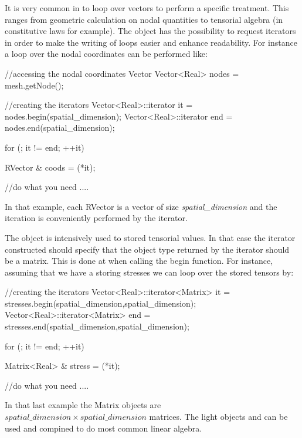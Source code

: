 It is very common in \akantu to loop over vectors to perform a specific 
treatment. This ranges from geometric calculation on nodal quantities 
to tensorial algebra (in constitutive laws for example).
The  object has the possibility to request iterators 
in order to make the writing of loops easier and enhance readability.
For instance a loop over the nodal coordinates can be performed like:
\begin{cpp}
  //accessing the nodal coordinates Vector
  Vector<Real> nodes = mesh.getNode();
  
  //creating the iterators
  Vector<Real>::iterator it = nodes.begin(spatial_dimension);
  Vector<Real>::iterator end = nodes.end(spatial_dimension);
  
  for (; it != end; ++it){
    RVector & coods = (*it);
    
    //do what you need
    ....
    
  }
\end{cpp}
In that example, each RVector is a vector of size \textit{spatial\_dimension}
and the iteration is conveniently performed by the  iterator.

The  object is intensively used to stored tensorial values.
In that case the iterator constructed should specify that the object type
returned by the iterator should be a matrix. This is done at when calling the 
begin function. For instance, assuming that we have a  storing 
stresses we can loop over the stored tensors by:

\begin{cpp}
  //creating the iterators
  Vector<Real>::iterator<Matrix> it = stresses.begin(spatial_dimension,spatial_dimension);
  Vector<Real>::iterator<Matrix> end = stresses.end(spatial_dimension,spatial_dimension);
  
  for (; it != end; ++it){
    Matrix<Real> & stress = (*it);
    
    //do what you need
    ....
    
  }
\end{cpp}
In that last example the Matrix objects are 
$spatial\_dimension \times spatial\_dimension$ matrices.
The light objects  and  can be used and compined 
to do most common linear algebra.

